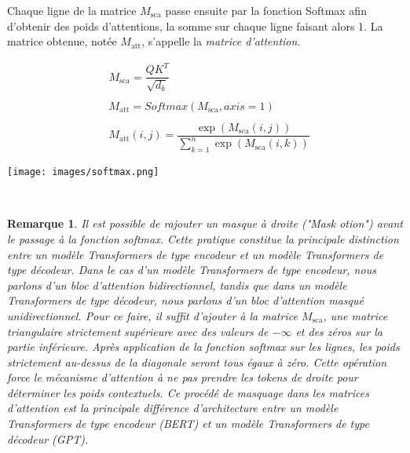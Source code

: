 \documentclass[12pt]{article}
\newtheorem{rmq}{Remarque}
\theoremstyle{definition}
\begin{document}
Chaque ligne de la matrice \(M_{\text{sca}}\) passe ensuite par la fonction Softmax afin d'obtenir des poids d'attentions, la somme sur chaque ligne faisant alors 1. La matrice obtenue, notée \(M_{\text{att}}\), s'appelle la \emph{matrice d'attention}. 

\begin{minipage}[t]{1\textwidth}
\begin{minipage}[c]{0.25\textwidth}
	
	\begin{align*}
		&M_{\text{sca}} = \dfrac{QK^T}{\sqrt{d_k}}\\\\
		&M_{\text{att}} = Softmax(M_{\text{sca}},axis = 1)\\\\
		&M_{\text{att}}(i,j) = \dfrac{\exp(M_{\text{sca}}(i,j))}{\displaystyle\sum_{k=1}^{n}\exp(M_{\text{sca}}(i,k))}	
	\end{align*}

	
\end{minipage}\hfil\begin{minipage}[c]{0.6\textwidth}
	\texttt{[image: images/softmax.png]}	
\end{minipage}
\hfil\\[1cm]
\end{minipage}



\begin{rmq}
	Il est possible de rajouter un masque à droite (\emph{"Mask otion"}) avant le passage à la fonction softmax. Cette pratique constitue la principale distinction entre un modèle Transformers de type encodeur et un modèle Transformers de type décodeur. Dans le cas d'un modèle Transformers de type encodeur, nous parlons d'un bloc d'attention bidirectionnel, tandis que dans un modèle Transformers de type décodeur, nous parlons d'un bloc d'attention masqué unidirectionnel.  Pour ce faire, il suffit d'ajouter à la matrice \(M_{\text{sca}}\), une matrice triangulaire strictement supérieure avec des valeurs de \(-\infty\) et des zéros sur la partie inférieure. Après application de la fonction softmax sur les lignes, les poids strictement au-dessus de la diagonale seront tous égaux à zéro. Cette opération force le mécanisme d'attention à ne pas prendre les tokens de droite pour déterminer les poids contextuels. Ce procédé de masquage dans les matrices d'attention est la principale différence d'architecture entre un modèle Transformers de type encodeur (BERT) et un modèle Transformers de type décodeur (GPT).
	
\end{rmq}
\end{document}
